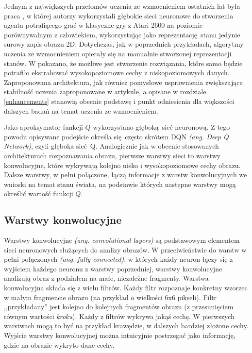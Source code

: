 \documentclass[polish,master,a4paper,oneside]{ppfcmthesis}
\begin{document}
Jednym z największych przełomów uczenia ze wzmocnieniem ostatnich lat była praca \break \cite{mnih2015human}, w której autorzy wykorzystali głębokie sieci neuronowe do stworzenia agenta potrafiącego grać w klasyczne gry z Atari 2600 na poziomie porównywalnym z człowiekiem, wykorzystując jako reprezentację stanu jedynie surowy zapis obrazu 2D. Dotychczas, jak w poprzednich przykładach, algorytmy uczenia ze wzmocnieniem opierały się na manualnie stworzonej reprezentacji stanów. W \cite{mnih2015human} pokazano, że możliwe jest stworzenie rozwiązania, które samo będzie potrafiło ekstrahować wysokopoziomowe cechy z niskopoziomowych danych. Zaproponowana architektura, jak również pomysłowe usprawnienia zwiększające stabilność uczenia zaproponowane w artykule, a opisane w rozdziale \ref {enhancements} stanowią obecnie podstawę i punkt odniesienia dla większości dalszych badań na temat uczenia ze wzmocnieniem.

Jako aproksymator funkcji $Q$ wykorzystano głęboką sieć neuronową. Z tego powodu opisywane podejście określa się często skrótem DQN \textit{(ang. Deep Q Network)}, czyli głęboka sieć Q. Analogicznie jak w obecnie stosowanych architekturach rozpoznawania obrazu, pierwsze warstwy sieci to warstwy konwolucyjne, które wykrywają kolejno nisko i wysokopoziomowe cechy obrazu. Dalsze warstwy, w pełni połączone, łączą informacje z warstw konwolucyjnych we wnioski na temat stanu świata, na podstawie których następne warstwy mogą określić wartość funkcji $Q$.

\subsection{Warstwy konwolucyjne}
Warstwy konwolucyjne \textit{(ang. convolutional layers)} są podstawowym elementem sieci neuronowych służących do analizy obrazów. W przeciwieństwie do warstw w pełni połączonych \textit{(ang. fully connected)}, w których każdy neuron łączy się z wyjściem każdego neuronu z warstwy poprzedniej, warstwy konwolucyjne analizują obraz z podziałem na małe, niezależne fragmenty. Warstwa konwolucyjna składa się z wielu filtrów. Każdy filtr rozpoznaje konkretny wzorzec w małym fragmencie obrazu (na przykład o wielkości 6x6 pikseli). Filtr ,,przykładany'' jest kolejno do kolejnych fragmentów obrazu (z przesunięciem równym wartości \textit{kroku}). Każdy z filtrów wykrywa jakąś cechę. W pierwszych warstwach mogą to być na przykład krawędzie, w dalszych bardziej złożone cechy. Wyjście warstwy konwolucyjnej można intuicyjnie postrzegać jako informację, gdzie na obrazie wykryto dane cechy.
\end{document}
